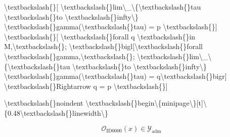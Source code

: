 \textbackslash{}textbackslash\{\}[
\textbackslash{}textbackslash\{\}lim\textbackslash{}\_\textbackslash{}\{\textbackslash{}textbackslash\{\}tau \textbackslash{}textbackslash\{\}to \textbackslash{}textbackslash\{\}infty\textbackslash{}\} \textbackslash{}textbackslash\{\}gamma(\textbackslash{}textbackslash\{\}tau) = p
\textbackslash{}textbackslash\{\}]
\textbackslash{}textbackslash\{\}[
\textbackslash{}textbackslash\{\}forall q \textbackslash{}textbackslash\{\}in M,\textbackslash{}textbackslash\{\};
\textbackslash{}textbackslash\{\}bigl[\textbackslash{}textbackslash\{\}forall \textbackslash{}textbackslash\{\}gamma,\textbackslash{}textbackslash\{\}; \textbackslash{}textbackslash\{\}lim\textbackslash{}\_\textbackslash{}\{\textbackslash{}textbackslash\{\}tau \textbackslash{}textbackslash\{\}to \textbackslash{}textbackslash\{\}infty\textbackslash{}\} \textbackslash{}textbackslash\{\}gamma(\textbackslash{}textbackslash\{\}tau) = q\textbackslash{}textbackslash\{\}bigr]
\textbackslash{}textbackslash\{\}Rightarrow q = p
\textbackslash{}textbackslash\{\}]

\textbackslash{}textbackslash\{\}noindent
\textbackslash{}textbackslash\{\}begin\textbackslash{}\{minipage\textbackslash{}\}[t]\textbackslash{}\{0.48\textbackslash{}textbackslash\{\}linewidth\textbackslash{}\}

\[
\mathcal{O}_{\mathrm{ID0000}}(x)\in\mathcal{Y}_{\mathrm{adm}}
\]

